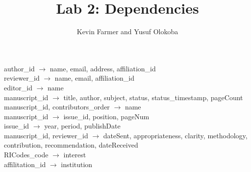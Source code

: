 \documentclass{article}
\title{Lab 2: Dependencies}
\author{Kevin Farmer and Yusuf Olokoba}
\newcommand{\ra}{$\rightarrow$ }
\begin{document}
\maketitle


author\_id \ra name, email, address, affiliation\_id \\
reviewer\_id \ra name, email, affiliation\_id \\
editor\_id \ra name \\

manuscript\_id \ra title, author, subject, status, status\_timestamp, pageCount \\

manuscript\_id, contributors\_order \ra name \\

manuscript\_id \ra issue\_id, position, pageNum \\

issue\_id \ra year, period, publishDate \\

manuscript\_id, reviewer\_id \ra dateSent, appropriateness, clarity, methodology, contribution, recommendation, dateReceived \\

RICodes\_code \ra interest \\

affilitation\_id \ra institution \\
\end{document}
